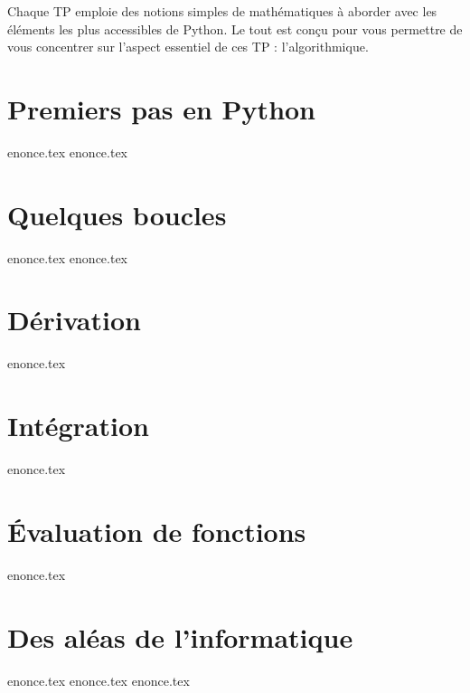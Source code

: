 \documentclass[a4paper,11pt]{article}
\begin{document}
Chaque TP emploie des notions simples de mathématiques à aborder avec
les éléments les plus accessibles de Python. Le tout est conçu pour vous
permettre de vous concentrer sur l'aspect essentiel de ces TP :
l'algorithmique.


\pagebreak
\section{Premiers pas en Python}
{enonce.tex}
\pagebreak
{enonce.tex}
\pagebreak
\section{Quelques boucles}
{enonce.tex}
\pagebreak
{enonce.tex}
\pagebreak
\section{Dérivation}
{enonce.tex}
\pagebreak
\section{Intégration}
{enonce.tex}
\pagebreak
\section{Évaluation de fonctions}
{enonce.tex}
\pagebreak
\section{Des aléas de l'informatique}
{enonce.tex}
\pagebreak
{enonce.tex}
\pagebreak
{enonce.tex}
\end{document}
